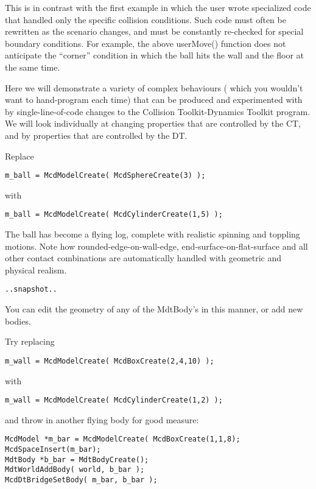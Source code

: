 \documentclass[11pt]{article}
\newcommand{\minisection}[1]{\noindent{\bf{#1}}}
\begin{document}
This is in contrast with the first example in which the user wrote
specialized code that handled only the specific collision conditions. Such
code must often be rewritten as the scenario changes, and must be
constantly re-checked for special boundary conditions. For example, the
above userMove() function does not anticipate the ``corner'' condition in
which the ball hits the wall and the floor at the same time.

Here we will demonstrate a variety of complex behaviours ( which you
wouldn't want to hand-program each time) that can be produced and experimented with by
single-line-of-code changes to the Collision Toolkit-Dynamics Toolkit program.
We will look individually at changing properties that are controlled by the
CT, and by properties that are controlled by the DT.

\minisection{changing geometrical properties}

Replace
\begin{verbatim}
m_ball = McdModelCreate( McdSphereCreate(3) );
\end{verbatim}
with
\begin{verbatim}
m_ball = McdModelCreate( McdCylinderCreate(1,5) );
\end{verbatim}

The ball has become a flying log, complete with realistic spinning and toppling
motions. Note how rounded-edge-on-wall-edge, end-surface-on-flat-surface
and all other contact combinations are automatically handled with geometric
and physical realism. 

\begin{verbatim}
..snapshot..
\end{verbatim}


You can edit the geometry of any of the MdtBody's in this manner, or add
new bodies.

Try replacing
\begin{verbatim}
m_wall = McdModelCreate( McdBoxCreate(2,4,10) );
\end{verbatim}
with
\begin{verbatim}
m_wall = McdModelCreate( McdCylinderCreate(1,2) );
\end{verbatim}
and throw in another flying body for good measure:
\begin{verbatim}
McdModel *m_bar = McdModelCreate( McdBoxCreate(1,1,8);
McdSpaceInsert(m_bar);
MdtBody *b_bar = MdtBodyCreate();
MdtWorldAddBody( world, b_bar );
McdDtBridgeSetBody( m_bar, b_bar );
\end{verbatim}
\end{document}
